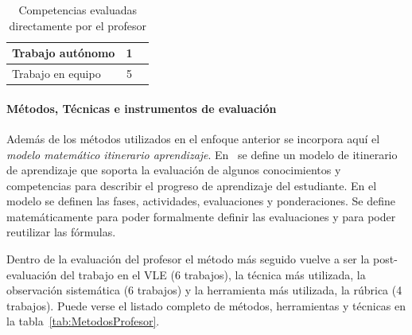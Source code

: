 \begin{table}
\begin{center}
\begin{tabular}{| m{6cm} | c | m{5cm} |}
    Trabajo autónomo & 1 &  \cite{lasa2013problem} \\
    \hline
    Trabajo en equipo & 5 &  \cite{lacuesta2009active,martin2013acquired,rodriguez2010portfolio,benlloch2007adapting,rashid2008engineering} \\
    \hline
  \end{tabular}
\end{center}
\caption{Competencias evaluadas directamente por el profesor}
\label{tab:CompetenciasProfesor}
\end{table}
 


\paragraph*{Métodos, Técnicas e instrumentos de evaluación}
Además de los métodos utilizados en el enfoque anterior se incorpora aquí el \emph{modelo matemático itinerario aprendizaje}. En~\cite{yang2014fine} se define un modelo de itinerario de aprendizaje que soporta la evaluación de algunos conocimientos y competencias para describir el progreso de aprendizaje del estudiante. En el modelo se definen las fases, actividades, evaluaciones y ponderaciones. Se define matemáticamente para poder formalmente definir las evaluaciones y para poder reutilizar las fórmulas. 

Dentro de la evaluación del profesor el método más seguido vuelve a ser la post-evaluación del trabajo en el VLE (6 trabajos), la técnica más utilizada, la observación sistemática (6 trabajos) y la herramienta más utilizada, la rúbrica (4 trabajos). Puede verse el listado completo de métodos, herramientas y técnicas en la tabla~\ref{tab:MetodosProfesor}.

